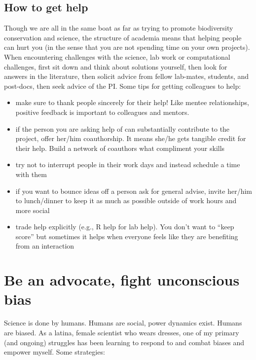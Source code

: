 \documentclass[12pt]{article}
\begin{document}
\subsection{How to get help}
\label{sec:help}
Though we are all in the same boat as far as trying to promote
biodiversity conservation and science, the structure of academia means
that helping people can hurt you (in the sense that you are not
spending time on your own projects). When encountering challenges with
the science, lab work or computational challenges, first sit down and
think about solutions yourself, then look for answers in the
literature, then solicit advice from fellow lab-mates, students, and
post-docs, then seek advice of the PI. Some tips for getting
colleagues to help:
\begin{itemize}
\item make sure to thank people sincerely for their help! Like mentee
  relationships, positive feedback is important to colleagues and
  mentors. 
\item if the person you are asking help of can substantially
  contribute to the project, offer her/him coauthorship. It means
  she/he gets tangible credit for their help. Build a network of
  coauthors what compliment your skills
\item try not to interrupt people in their work days and instead
  schedule a time with them
\item if you want to bounce ideas off a person ask for general advise,
  invite her/him to lunch/dinner to keep it as much as possible
  outside of work hours and more social
\item trade help explicitly (e.g., R help for lab help). You don't
  want to ``keep score'' but sometimes it helps when everyone feels
  like they are benefiting from an interaction
\end{itemize}


\section{Be an advocate, fight unconscious bias}
\label{sec:advocate}
Science is done by humans. Humans are social, power dynamics
exist. Humans are biased. As a latina, female scientist who wears
dresses, one of my primary (and ongoing) struggles has been learning
to respond to and combat biases and empower myself. Some strategies:
 
\end{document}
